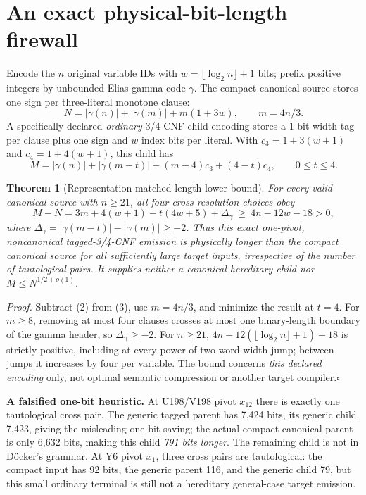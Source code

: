 \documentclass[10pt]{article}
\newtheorem{theorem}{Theorem}
\begin{document}
\section{An exact physical-bit-length firewall}
Encode the $n$ original variable IDs with $w=\lfloor\log_2n\rfloor+1$ bits; prefix positive integers by unbounded Elias-gamma code $\gamma$. The compact canonical source stores one sign per three-literal monotone clause:
\[
 N=|\gamma(n)|+|\gamma(m)|+m(1+3w),\qquad m=4n/3.\tag{2}
\]
A specifically declared \emph{ordinary} 3/4-CNF child encoding stores a 1-bit width tag per clause plus one sign and $w$ index bits per literal. With $c_3=1+3(w+1)$ and $c_4=1+4(w+1)$, this child has
\[
 M=|\gamma(n)|+|\gamma(m-t)|+(m-4)c_3+(4-t)c_4,
 \qquad 0\le t\le4.\tag{3}
\]
\begin{theorem}[Representation-matched length lower bound]
For every valid canonical source with $n\ge21$, all four cross-resolution choices obey
\[
 \boxed{M-N=3m+4(w+1)-t(4w+5)+\Delta_\gamma
 \ \ge\ 4n-12w-18>0,}\tag{4}
\]
where $\Delta_\gamma=|\gamma(m-t)|-|\gamma(m)|\ge-2$. Thus this exact \emph{one-pivot, noncanonical tagged-3/4-CNF} emission is physically longer than the compact canonical source for all sufficiently large target inputs, irrespective of the number of tautological pairs. It supplies neither a canonical hereditary child nor $M\le N^{1/2+o(1)}$.
\end{theorem}
\noindent\textit{Proof.} Subtract (2) from (3), use $m=4n/3$, and minimize the result at $t=4$. For $m\ge8$, removing at most four clauses crosses at most one binary-length boundary of the gamma header, so $\Delta_\gamma\ge-2$. For $n\ge21$, $4n-12(\lfloor\log_2n\rfloor+1)-18$ is strictly positive, including at every power-of-two word-width jump; between jumps it increases by four per variable. The bound concerns \emph{this declared encoding} only, not optimal semantic compression or another target compiler.\hfill$\square$

\noindent\textbf{A falsified one-bit heuristic.} At U198/V198 pivot $x_{12}$ there is exactly one tautological cross pair. The generic tagged parent has 7,424 bits, its generic child 7,423, giving the misleading one-bit saving; the actual compact canonical parent is only 6,632 bits, making this child \emph{791 bits longer}. The remaining child is not in D\"ocker's grammar. At Y6 pivot $x_1$, three cross pairs are tautological: the compact input has 92 bits, the generic parent 116, and the generic child 79, but this small ordinary terminal is still not a hereditary general-case target emission.
\end{document}
